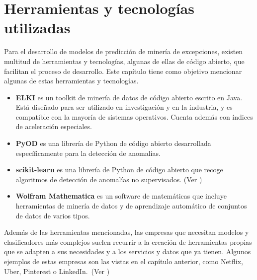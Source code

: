 \chapter{Herramientas y tecnologías utilizadas}
Para el desarrollo de modelos de predicción de minería de excepciones, existen multitud de
herramientas y tecnologías, algunas de ellas de código abierto, que facilitan el proceso de
desarrollo. Este capítulo tiene como objetivo mencionar algunas de estas herramientas y
tecnologías.

\begin{itemize}
	\item \textbf{ELKI} es un toolkit de minería de datos de código abierto escrito en Java. Está
		diseñado para ser utilizado en investigación y en la industria, y es compatible con la mayoría
		de sistemas operativos. Cuenta además con índices de aceleración especiales.
	\item \textbf{PyOD} es una librería de Python de código abierto desarrollada específicamente
		para la detección de anomalías.~\cite{pyod}
	\item \textbf{scikit-learn} es una librería de Python de código abierto que recoge algoritmos
		de detección de anomalías no supervisados. (Ver )
	\item \textbf{Wolfram Mathematica} es un software de matemáticas que incluye herramientas de
		minería de datos y de aprendizaje automático de conjuntos de datos de varios
		tipos.~\cite{wolfram}
\end{itemize}

Además de las herramientas mencionadas, las empresas que necesitan modelos y clasificadores más
complejos suelen recurrir a la creación de herramientas propias que se adapten a sus necesidades
y a los servicios y datos que ya tienen. Algunos ejemplos de estas empresas son las vistas en el
capítulo anterior, como Netflix, Uber, Pinterest o LinkedIn.~(Ver )
